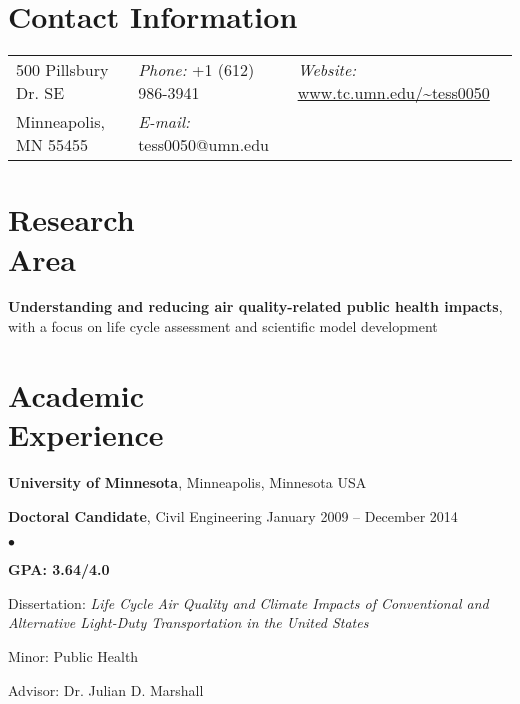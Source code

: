 \documentclass[margin,line,10pt]{res}
\newenvironment{list1}{
  \begin{list}{\ding{113}}{%
      \setlength{\itemsep}{0in}
      \setlength{\parsep}{0in} \setlength{\parskip}{0in}
      \setlength{\topsep}{0in} \setlength{\partopsep}{0in} 
      \setlength{\leftmargin}{0.17in}}}{\end{list}}
\newenvironment{list2}{
  \begin{list}{$\bullet$}{%
      \setlength{\itemsep}{0in}
      \setlength{\parsep}{0in} \setlength{\parskip}{0in}
      \setlength{\topsep}{0in} \setlength{\partopsep}{0in} 
      \setlength{\leftmargin}{0.2in}}}{\end{list}}
\begin{document}
\thispagestyle{empty}

\begin{resume}
\section{\sc Contact Information}
\vspace{.05in}
\begin{tabular}{@{}p{1.6in}p{1.7in}p{2.5in}}
500 Pillsbury Dr. SE	& 
{\it Phone:} +1 (612) 986-3941 & 
{\it Website:} \url{www.tc.umn.edu/~tess0050} \\            
Minneapolis, MN 55455		& 
{\it E-mail:}  tess0050@umn.edu & \\     		    
\end{tabular}

\section{\sc Research\\Area}

\textbf{Understanding and reducing air quality-related public health impacts}, with a focus on life cycle assessment and scientific model development


\section{\sc Academic\\Experience}
\textbf{University of Minnesota}, Minneapolis, Minnesota USA\\

\vspace*{-.13in}

\begin{list1}
\item[] \textbf{Doctoral Candidate}, Civil Engineering \hfill January 2009 -- December 2014\\
\begin{list2}
\vspace*{-.12in}
\item \textbf{GPA: 3.64/4.0}
\item Dissertation: \textit{Life Cycle Air Quality and Climate Impacts of Conventional and Alternative Light-Duty Transportation in the United States}
\item Minor: Public Health
\item Advisor:  Dr. Julian D. Marshall
\end{list2}


\end{list1}
\end{resume}
\end{document}
